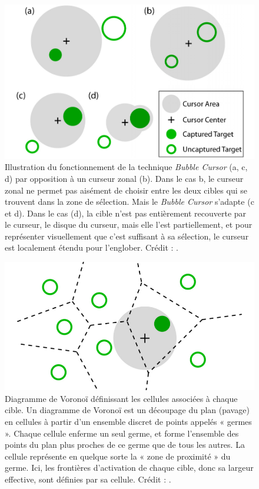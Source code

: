 	\begin{figure}[H]
		\centering
		\includegraphics[width=\textwidth]{figures/ch2/bubble}
		\caption{Illustration du fonctionnement de la technique \emph{Bubble Cursor} (a, c, d) par opposition à un curseur zonal (b). Dans le cas b, le curseur zonal ne permet pas aisément de choisir entre les deux cibles qui se trouvent dans la zone de sélection. Mais le \emph{Bubble Cursor} s'adapte (c et d). Dans le cas (d), la cible n'est pas entièrement recouverte par le curseur, le disque du curseur, mais elle l'est partiellement, et pour représenter visuellement que c'est suffisant à sa sélection, le curseur est localement étendu pour l'englober. Crédit : \cite{grossman2005bubble}.}
		\label{fig:bubble}
	\end{figure}
	
	\begin{figure}[ht]
		\centering
		\includegraphics[width=\textwidth]{figures/ch2/voronoi}
		\caption{Diagramme de Voronoï définissant les cellules associées à chaque cible. Un diagramme de Voronoï est un découpage du plan (pavage) en cellules à partir d'un ensemble discret de points appelés « germes ». Chaque cellule enferme un seul germe, et forme l'ensemble des points du plan plus proches de ce germe que de tous les autres. La cellule représente en quelque sorte la « zone de proximité » du germe. Ici, les frontières d'activation de chaque cible, donc sa largeur effective, sont définies par sa cellule. Crédit : \cite{grossman2005bubble}.}
		\label{fig:voronoi}
	\end{figure}
	
